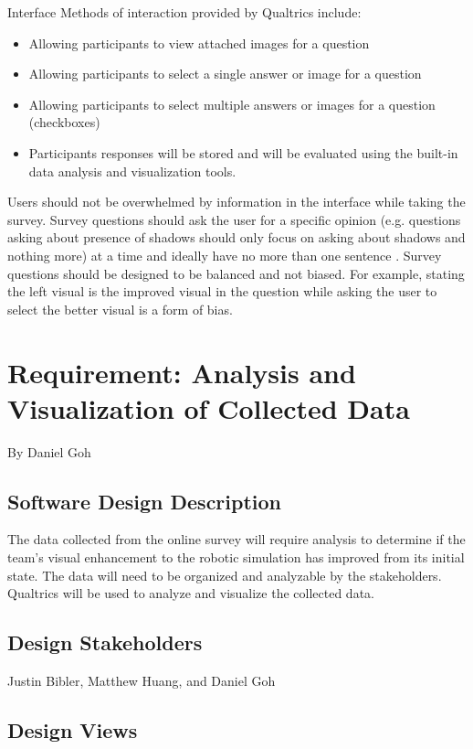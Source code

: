 ﻿\documentclass[10pt,journal,compsoc,draftclsnofoot]{IEEEtran}
\makeatletter
\newcommand\subparagraph{%
  \@startsection{subparagraph}{5}
  {\parindent}
  {3.25ex \@plus 1ex \@minus .2ex}
  {0.75ex plus 0.1ex}
  {\normalfont\normalsize\bfseries}}
\newcounter{subparagraph}[paragraph]
\makeatother
\begin{document}
\begin{flushleft}
\subparagraph{Interface}
Methods of interaction provided by Qualtrics include:
\begin{itemize}
\item Allowing participants to view attached images for a question
\item Allowing participants to select a single answer or image for a question
\item Allowing participants to select multiple answers or images for a question  (checkboxes)
\item Participants responses will be stored and will be evaluated using the built-in data analysis and visualization tools.
\end{itemize}

Users should not be overwhelmed by information in the interface while taking the survey.
Survey questions should ask the user for a specific opinion (e.g. questions asking about presence of shadows should only focus on asking about shadows and nothing more) at a time and ideally have no more than one sentence \cite{SMquestions}. 
Survey questions should be designed to be balanced and not biased.
For example, stating the left visual is the improved visual in the question while asking the user to select the better visual is a form of bias.  

\newpage

\section{Requirement: Analysis and Visualization of Collected Data}
\large{By Daniel Goh}

\normalsize
\subsection{Software Design Description}
The data collected from the online survey will require analysis to determine if the team's visual enhancement to the robotic simulation has improved from its initial state.
The data will need to be organized and analyzable by the stakeholders.
Qualtrics will be used to analyze and visualize the collected data.

\subsection{Design Stakeholders}
Justin Bibler, Matthew Huang, and Daniel Goh

\subsection{Design Views}

\end{flushleft}
\end{document}

